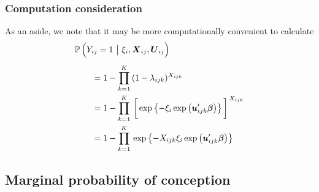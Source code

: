 \documentclass[11pt]{article}
\newcommand{\prob}{\mathbb{P}\,}
\renewcommand{\vec}{\boldsymbol}
\begin{document}
\subsubsection{Computation consideration}

As an aside, we note that it may be more computationally convenient to calculate
\begin{align*} \MoveEqLeft
\prob\Big( Y_{ij} = 1 ~\big|~ \xi_i, \vec{X}_{ij}, \vec{U}_{ij}  \Big) \\[1ex]
&= 1 - \prod_{k=1}^K\, (1 - \lambda_{ijk})^{X_{ijk}} \\
&= 1 - \prod_{k=1}^K\, \bigg[ \exp \left\{ -\xi_i \exp\left( \vec{u}_{ijk}^\prime \vec{\beta} \right) \right\} \bigg]^{\,X_{ijk}} \\
&= 1 - \prod_{k=1}^K\, \exp \left\{ -X_{ijk} \xi_i \exp\left( \vec{u}_{ijk}^\prime \vec{\beta} \right) \right\} \\
\end{align*}







\subsection{Marginal probability of conception}
\end{document}
